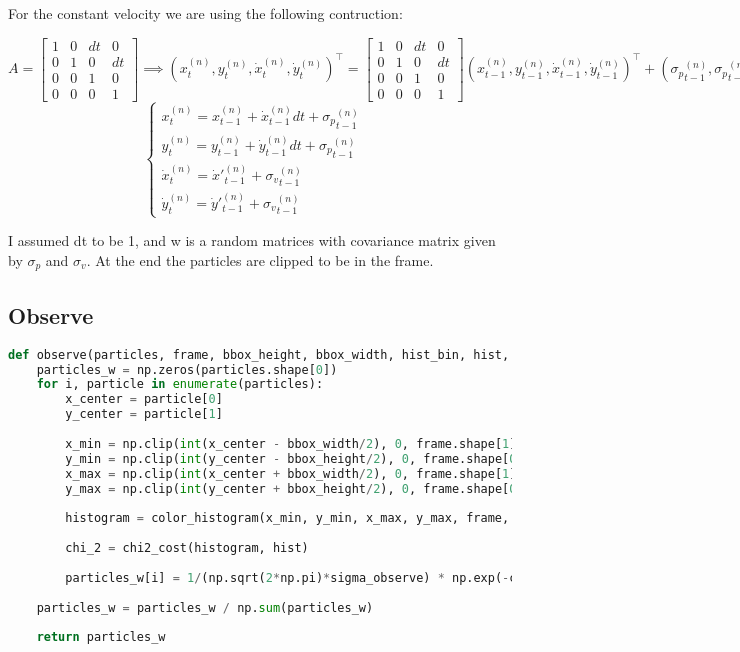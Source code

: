 \documentclass{ETHExercise}
\begin{document}
For the constant velocity we are using the following contruction:
\begin{center}
  $A = \begin{bmatrix}
    1 & 0 & dt & 0\\
    0 & 1 & 0 & dt\\
    0 & 0 & 1 & 0\\
    0 & 0 & 0 & 1
  \end{bmatrix} \implies (x^{(n)}_t, y^{(n)}_t, \dot{x}^{(n)}_t, \dot{y}^{(n)}_t)^\top = \begin{bmatrix}
    1 & 0 & dt & 0\\
    0 & 1 & 0 & dt\\
    0 & 0 & 1 & 0\\
    0 & 0 & 0 & 1
  \end{bmatrix} (x^{(n)}_{t-1}, y^{(n)}_{t-1}, \dot{x}^{(n)}_{t-1}, \dot{y}^{(n)}_{t-1})^\top + ({\sigma_p}^{(n)}_{t-1}, {\sigma_p}^{(n)}_{t-1}, {\sigma_v}^{(n)}_{t-1}, {\sigma_v}^{(n)}_{t-1})^\top=$\\
  \[
  \begin{cases}
    x^{(n)}_t = x^{(n)}_{t-1} + \dot{x}^{(n)}_{t-1} dt + {\sigma_p}^{(n)}_{t-1}& \\
    y^{(n)}_t = y^{(n)}_{t-1} + \dot{y}^{(n)}_{t-1} dt + {\sigma_p}^{(n)}_{t-1}& \\
    \dot{x}^{(n)}_{t} = \dot{x}'^{(n)}_{t-1} + {\sigma_v}^{(n)}_{t-1} &\\
    \dot{y}^{(n)}_{t} = \dot{y}'^{(n)}_{t-1} + {\sigma_v}^{(n)}_{t-1}
  \end{cases}
  \]
\end{center}
I assumed dt to be 1, and w is a random matrices with covariance matrix given by $\sigma_p$ and $\sigma_v$.
At the end the particles are clipped to be in the frame.

\subsection{Observe}
\begin{lstlisting}[language=Python, caption=observe]
  def observe(particles, frame, bbox_height, bbox_width, hist_bin, hist, sigma_observe):
    particles_w = np.zeros(particles.shape[0])
    for i, particle in enumerate(particles):
        x_center = particle[0]
        y_center = particle[1]
        
        x_min = np.clip(int(x_center - bbox_width/2), 0, frame.shape[1]-1)
        y_min = np.clip(int(y_center - bbox_height/2), 0, frame.shape[0]-1)
        x_max = np.clip(int(x_center + bbox_width/2), 0, frame.shape[1]-1)
        y_max = np.clip(int(y_center + bbox_height/2), 0, frame.shape[0]-1)
        
        histogram = color_histogram(x_min, y_min, x_max, y_max, frame, hist_bin)
        
        chi_2 = chi2_cost(histogram, hist)
        
        particles_w[i] = 1/(np.sqrt(2*np.pi)*sigma_observe) * np.exp(-chi_2**2/(2*sigma_observe**2))
        
    particles_w = particles_w / np.sum(particles_w)
    
    return particles_w
\end{lstlisting}
\end{document}
